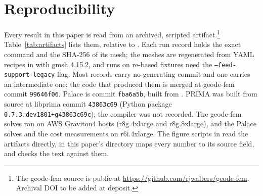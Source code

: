 \documentclass{anvil-paper}
\begin{document}
\section{Reproducibility}
\label{sec:repro}

Every result in this paper is read from an archived, scripted
artifact.\footnote{The geode-fem source is public at
\url{https://github.com/rjwalters/geode-fem}. Archival DOI to be added at
deposit.}
Table~\ref{tab:artifacts} lists them, relative to
. Each run record holds the exact
command and the SHA-256 of its mesh; the meshes are regenerated from YAML
recipes in  with gmsh 4.15.2, and runs on re-based
fixtures need the \texttt{--feed-support-legacy} flag. Most records carry no
generating commit and one carries an intermediate one; the code that
produced them is merged at geode-fem commit \texttt{99646f06}. Palace is
commit \texttt{fba6a5b}, built from
. PRIMA was built from source at
libprima commit \texttt{43863c69} (Python package
\texttt{0.7.3.dev1801+g43863c69c}); the compiler was not recorded. The
geode-fem solves ran on AWS Graviton4 hosts (r8g.4xlarge and r8g.8xlarge),
and the Palace solves and the cost measurements on r6i.4xlarge. The figure
scripts in  read the artifacts directly,
 in this paper's directory maps every number to its
source field, and  checks the text against them.
\end{document}
